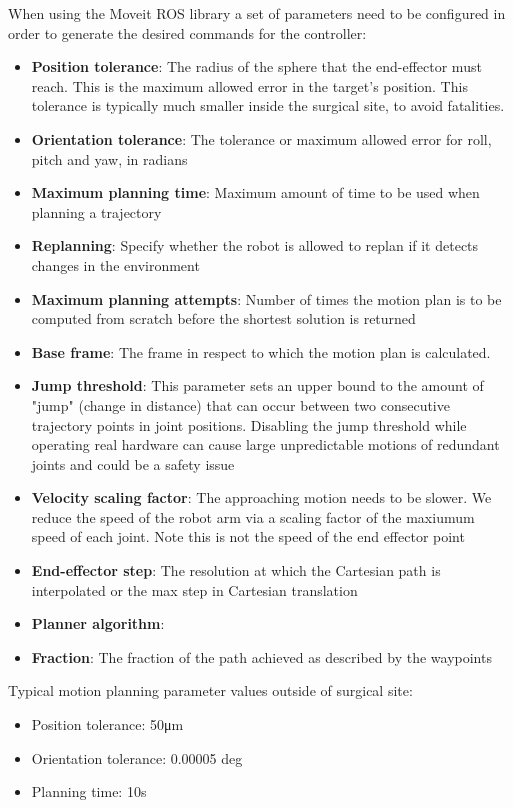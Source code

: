 When using the Moveit ROS library a set of parameters need to be configured in order to generate the desired commands for the controller:
\begin{itemize}
	\item \textbf{Position tolerance}: The radius of the sphere that the end-effector must reach. This is the maximum allowed error in the target's position.
	This tolerance is typically much smaller inside the surgical site, to avoid fatalities.
	\item \textbf{Orientation tolerance}: The tolerance or maximum allowed error for roll, pitch and yaw, in radians
	\item \textbf{Maximum planning time}: Maximum amount of time to be used when planning a trajectory
	\item \textbf{Replanning}: Specify whether the robot is allowed to replan if it detects changes in the environment
	\item \textbf{Maximum planning attempts}: Number of times the motion plan is to be computed from scratch before the shortest solution is returned
	\item \textbf{Base frame}: The frame in respect to which the motion plan is calculated.
	\item \textbf{Jump threshold}: This parameter sets an upper bound to the amount of "jump" (change in distance) that can occur between two consecutive trajectory points in joint 
	positions. Disabling the jump threshold while operating real hardware can cause large unpredictable motions of redundant joints 
	and could be a safety issue
	\item \textbf{Velocity scaling factor}: The approaching motion needs to be slower. We reduce the speed of the robot arm via a scaling factor of the 
	maxiumum speed of each joint. Note this is not the speed of the end effector point
	\item \textbf{End-effector step}: The resolution at which the Cartesian path is interpolated or the max step in Cartesian translation
	\item \textbf{Planner algorithm}:
	\item \textbf{Fraction}: The fraction of the path achieved as described by the waypoints
\end{itemize}

Typical motion planning parameter values outside of surgical site:
\begin{itemize}
	\item Position tolerance: 50μm
	\item Orientation tolerance: 0.00005 deg
	\item Planning time: 10s
\end{itemize}

